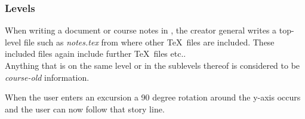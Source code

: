 
\begin{frame}
  \frametitle{Levels}
  \begin{module}[id=levels]

When writing a document or course notes in \stex, the creator general writes a top-level file such as \textit{notes.tex} from where other \TeX\ files are included. These included files again include further \TeX\ files etc.. \\

Anything that is on the same level or in the sublevels thereof is considered to be \textit{course-old} information.


When the user enters an excursion a 90 degree rotation around the y-axis occurs and the user can now follow that story line.


\end{module}
\end{frame}
